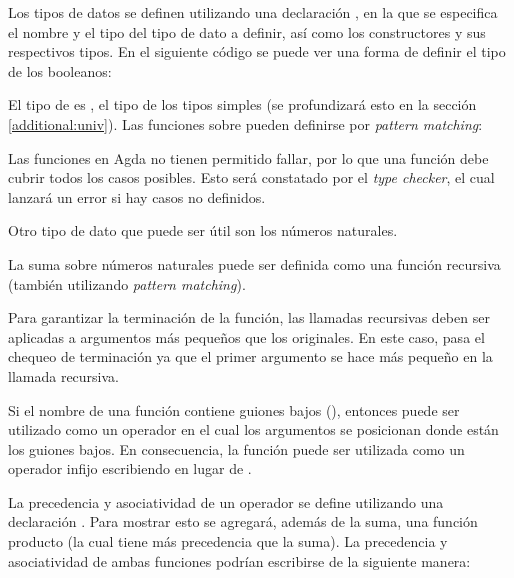 Los tipos de datos se definen utilizando una declaración , en la que se especifica el nombre y el tipo del tipo de dato a definir, así como los constructores y sus respectivos tipos. En el siguiente código se puede ver una forma de definir el tipo de los booleanos:


El tipo de  es , el tipo de los tipos simples (se profundizará esto en la sección \ref{additional:univ}). Las funciones sobre  pueden definirse por \textit{pattern matching}:


Las funciones en Agda no tienen permitido fallar, por lo que una función debe cubrir todos los casos posibles. Esto será constatado por el \textit{type checker}, el cual lanzará un error si hay casos no definidos. 

Otro tipo de dato que puede ser útil son los números naturales. 


La suma sobre números naturales puede ser definida como una función recursiva (también utilizando \textit{pattern matching}). 


Para garantizar la terminación de la función, las llamadas recursivas deben ser aplicadas a argumentos más pequeños que los originales. En este caso, \AgdaFunction{\_+\_} pasa el chequeo de terminación ya que el primer argumento se hace más pequeño en la llamada recursiva. 

Si el nombre de una función contiene guiones bajos (\AgdaSymbol{\_}), entonces puede ser utilizado como un operador en el cual los argumentos se posicionan donde están los guiones bajos. En consecuencia, la función \AgdaFunction{\_+\_} puede ser utilizada como un operador infijo escribiendo  \AgdaFunction{+}  en lugar de \AgdaFunction{\_+\_} . 

La precedencia y asociatividad de un operador se define utilizando una declaración . Para mostrar esto se agregará, además de la suma, una función producto (la cual tiene más precedencia que la suma). La precedencia y asociatividad de ambas funciones podrían escribirse de la siguiente manera:


